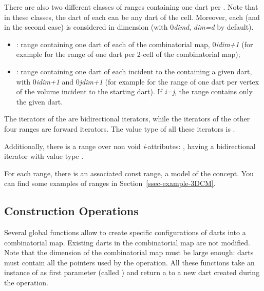 There are also two different classes of ranges containing one dart per
. Note that in these classes, the dart of each  can
be any dart of the cell. Moreover, each  (and  in the
second case) is considered in dimension  (with 
0\myleq{}\emph{dim}\myleq{}\emph{d}, \emph{dim=d} by default).
\begin{itemize}
\item {}: range containing one dart of
  each  of the combinatorial map, 0\myleq{}\emph{i}\myleq{}\emph{dim+1} (for
  example  for the range of one dart per
  2-cell of the combinatorial map);
\item {}: range
  containing one dart of each  incident to the 
  containing a given dart, with 0\myleq{}\emph{i}\myleq{}\emph{dim+1} and 
  0\myleq{}\emph{j}\myleq{}\emph{dim+1} (for example
   for the range of
  one dart per vertex of the volume incident to the starting dart).
  If \emph{i}=\emph{j}, the range contains only the given dart.
\end{itemize}

The iterators of the  are bidirectional iterators, 
while the iterators of the other four ranges are forward iterators. 
The value type of all these iterators is .

Additionally, there is a range over non void \emph{i}-attributes:
, having a bidirectional iterator with
value type .

For each range, there is an associated const range, a model of the
 concept.  You can find some examples of ranges in
Section~\ref{ssec-example-3DCM}.

\subsection{Construction Operations}\label{ssec-construction}

Several global functions allow to create specific configurations of
darts into a combinatorial map. Existing darts in the combinatorial
map are not modified. Note that the dimension of the combinatorial map
must be large enough: darts must contain all the \betats{} pointers used by the
operation. All these functions take an instance of
 as first parameter (called ) and return
a  to a new dart created during the operation.


